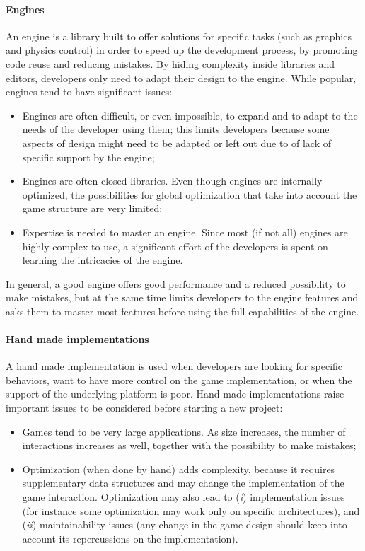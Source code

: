 \paragraph{Engines} An engine is a library built to offer solutions for specific tasks (such as graphics and physics control) in order to speed up the development process, by promoting code reuse and reducing mistakes. By hiding complexity inside libraries and editors, developers only need to adapt their design to the engine. While popular, engines tend to have significant issues:
\begin{itemize}
\item Engines are often difficult, or even impossible, to expand and to adapt to the needs of the developer using them; this limits developers because some aspects of design might need to be adapted or left out due to of lack of specific support by the engine;
\item Engines are often closed libraries. Even though engines are internally optimized, the possibilities for global optimization that take into account the game structure are very limited;
\item Expertise is needed to master an engine. Since most (if not all) engines are highly complex to use, a significant effort of the developers is spent on learning the intricacies of the engine.
\end{itemize}
In general, a good engine offers good performance and a reduced possibility to make mistakes, but at the same time limits developers to the engine features and asks them to master most features before using the full capabilities of the engine.

\paragraph{Hand made implementations} A hand made implementation is used when developers are looking for specific behaviors, want to have more control on the game implementation, or when the support of the underlying platform is poor.
Hand made implementations raise important issues to be considered before starting a new project:
\begin{itemize}
\item Games tend to be very large applications. As size increases, the number of interactions increases as well, together with the possibility to make mistakes;
\item Optimization (when done by hand) adds complexity, because it requires supplementary data structures and may change the implementation of the game interaction. Optimization may also lead to (\textit{i}) implementation issues (for instance some optimization may work only on specific architectures), and (\textit{ii}) maintainability issues (any change in the game design should keep into account its repercussions on the implementation).
\end{itemize}



